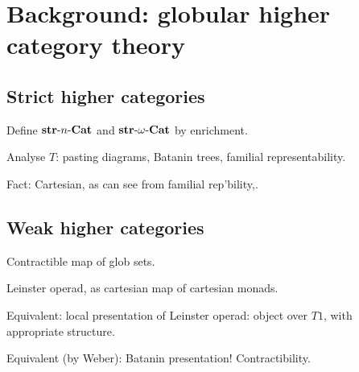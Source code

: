 
\chapter{Background: globular higher category theory}


\section{Strict higher categories}

\para Define $\strnCat$ and $\strnCat[\omega]$ by enrichment. 


\para Analyse $T$: pasting diagrams, Batanin trees, familial representability.

Fact: Cartesian, as can see from familial rep'bility\cite{street:petit-topos},\cite{carboni-johnstone}.

\section{Weak higher categories}

 Contractible map of glob sets.

 Leinster operad, as cartesian map of cartesian monads.

\para Equivalent: local presentation of Leinster operad: object over $T1$, with appropriate structure.

\para Equivalent (by Weber): Batanin presentation!
\para Contractibility.




